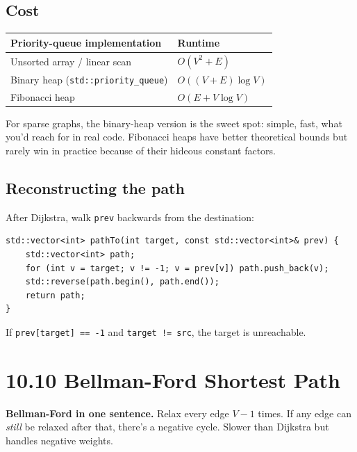 \documentclass[11pt]{article}
\begin{document}
\subsection*{Cost}

\begin{center}
\begin{tabular}{ll}
\hline
Priority-queue implementation & Runtime \\
\hline
Unsorted array / linear scan & $O(V^2 + E)$ \\
Binary heap (\texttt{std::priority\_queue}) & $O((V + E) \log V)$ \\
Fibonacci heap & $O(E + V \log V)$ \\
\hline
\end{tabular}
\end{center}

For sparse graphs, the binary-heap version is the sweet spot: simple, fast, what you'd reach for in real code. Fibonacci heaps have better theoretical bounds but rarely win in practice because of their hideous constant factors.

\subsection*{Reconstructing the path}

After Dijkstra, walk \texttt{prev} backwards from the destination:

\begin{lstlisting}[basicstyle=\ttfamily\small,frame=single]
std::vector<int> pathTo(int target, const std::vector<int>& prev) {
    std::vector<int> path;
    for (int v = target; v != -1; v = prev[v]) path.push_back(v);
    std::reverse(path.begin(), path.end());
    return path;
}
\end{lstlisting}

If \texttt{prev[target] == -1} and \texttt{target != src}, the target is unreachable.

\section{10.10 Bellman-Ford Shortest Path}

\begin{ideabox}
\textbf{Bellman-Ford in one sentence.} Relax every edge $V-1$ times. If any edge can \emph{still} be relaxed after that, there's a negative cycle. Slower than Dijkstra but handles negative weights.
\end{ideabox}
\end{document}
